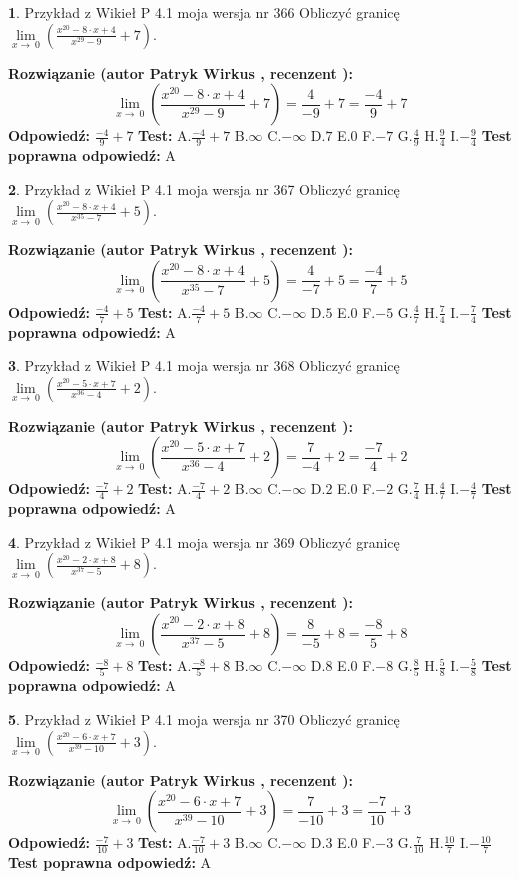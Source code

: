 \documentclass[12pt, a4paper]{article}
\theoremstyle{definition} %
\newtheorem{zad}{}
\newcommand{\zadStart}[1]{\begin{zad}#1\newline}
\newcommand{\zadStop}{\end{zad}}
\newcommand{\rozwStart}[2]{\noindent \textbf{Rozwiązanie (autor #1 , recenzent #2): }\newline}
\newcommand{\rozwStop}{\newline}
\newcommand{\odpStart}{\noindent \textbf{Odpowiedź:}\newline}
\newcommand{\odpStop}{\newline}
\newcommand{\testStart}{\noindent \textbf{Test:}\newline}
\newcommand{\testStop}{\newline}
\newcommand{\kluczStart}{\noindent \textbf{Test poprawna odpowiedź:}\newline}
\newcommand{\kluczStop}{\newline}
\begin{document}
\zadStart{Przykład z Wikieł P 4.1 moja wersja nr 366}
Obliczyć granicę $\lim\limits_{x\to\ 0}(\frac{x^{20}-8 \cdot x +4}{x^{29}-9}+7)$.
\zadStop
\rozwStart{Patryk Wirkus}{}
$$\lim\limits_{x\to\ 0}(\frac{x^{20}-8 \cdot x +4}{x^{29}-9}+7)=\frac{4}{-9}+7=\frac{-4}{9}+7$$
\rozwStop
\odpStart
$\frac{-4}{9}+7$
\odpStop
\testStart
A.$\frac{-4}{9}+7$
B.$\infty$
C.$-\infty$
D.$7$
E.$0$
F.$-7$
G.$\frac{4}{9}$
H.$\frac{9}{4}$
I.$-\frac{9}{4}$
\testStop
\kluczStart
A
\kluczStop



\zadStart{Przykład z Wikieł P 4.1 moja wersja nr 367}
Obliczyć granicę $\lim\limits_{x\to\ 0}(\frac{x^{20}-8 \cdot x +4}{x^{35}-7}+5)$.
\zadStop
\rozwStart{Patryk Wirkus}{}
$$\lim\limits_{x\to\ 0}(\frac{x^{20}-8 \cdot x +4}{x^{35}-7}+5)=\frac{4}{-7}+5=\frac{-4}{7}+5$$
\rozwStop
\odpStart
$\frac{-4}{7}+5$
\odpStop
\testStart
A.$\frac{-4}{7}+5$
B.$\infty$
C.$-\infty$
D.$5$
E.$0$
F.$-5$
G.$\frac{4}{7}$
H.$\frac{7}{4}$
I.$-\frac{7}{4}$
\testStop
\kluczStart
A
\kluczStop



\zadStart{Przykład z Wikieł P 4.1 moja wersja nr 368}
Obliczyć granicę $\lim\limits_{x\to\ 0}(\frac{x^{20}-5 \cdot x +7}{x^{36}-4}+2)$.
\zadStop
\rozwStart{Patryk Wirkus}{}
$$\lim\limits_{x\to\ 0}(\frac{x^{20}-5 \cdot x +7}{x^{36}-4}+2)=\frac{7}{-4}+2=\frac{-7}{4}+2$$
\rozwStop
\odpStart
$\frac{-7}{4}+2$
\odpStop
\testStart
A.$\frac{-7}{4}+2$
B.$\infty$
C.$-\infty$
D.$2$
E.$0$
F.$-2$
G.$\frac{7}{4}$
H.$\frac{4}{7}$
I.$-\frac{4}{7}$
\testStop
\kluczStart
A
\kluczStop



\zadStart{Przykład z Wikieł P 4.1 moja wersja nr 369}
Obliczyć granicę $\lim\limits_{x\to\ 0}(\frac{x^{20}-2 \cdot x +8}{x^{37}-5}+8)$.
\zadStop
\rozwStart{Patryk Wirkus}{}
$$\lim\limits_{x\to\ 0}(\frac{x^{20}-2 \cdot x +8}{x^{37}-5}+8)=\frac{8}{-5}+8=\frac{-8}{5}+8$$
\rozwStop
\odpStart
$\frac{-8}{5}+8$
\odpStop
\testStart
A.$\frac{-8}{5}+8$
B.$\infty$
C.$-\infty$
D.$8$
E.$0$
F.$-8$
G.$\frac{8}{5}$
H.$\frac{5}{8}$
I.$-\frac{5}{8}$
\testStop
\kluczStart
A
\kluczStop



\zadStart{Przykład z Wikieł P 4.1 moja wersja nr 370}
Obliczyć granicę $\lim\limits_{x\to\ 0}(\frac{x^{20}-6 \cdot x +7}{x^{39}-10}+3)$.
\zadStop
\rozwStart{Patryk Wirkus}{}
$$\lim\limits_{x\to\ 0}(\frac{x^{20}-6 \cdot x +7}{x^{39}-10}+3)=\frac{7}{-10}+3=\frac{-7}{10}+3$$
\rozwStop
\odpStart
$\frac{-7}{10}+3$
\odpStop
\testStart
A.$\frac{-7}{10}+3$
B.$\infty$
C.$-\infty$
D.$3$
E.$0$
F.$-3$
G.$\frac{7}{10}$
H.$\frac{10}{7}$
I.$-\frac{10}{7}$
\testStop
\kluczStart
A
\kluczStop
\end{document}
